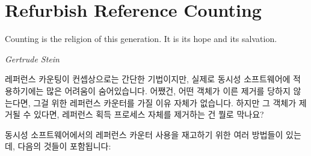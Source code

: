 
\section{Refurbish Reference Counting}
\label{sec:together:Refurbish Reference Counting}
%
\epigraph{Counting is the religion of this generation.  It is its
	  hope and its salvation.}
	 {\emph{Gertrude Stein}}

레퍼런스 카운팅이 컨셉상으로는 간단한 기법이지만, 실제로 동시성 소프트웨어에
적용하기에는 많은 어려움이 숨어있습니다.
어쨌건, 어떤 객체가 이른 제거를 당하지 않는다면, 그걸 위한 레퍼런스 카운터를
가질 이유 자체가 없습니다.
하지만 그 객체가 제거될 수 있다면, 레퍼런스 획득 프로세스 자체를 제거하는 건
뭘로 막나요?

동시성 소프트웨어에서의 레퍼런스 카운터 사용을 재고하기 위한 여러 방법들이 있는데, 다음의 것들이 포함됩니다:

\iffalse

Although reference counting is a conceptually simple technique,
many devils hide in the details when it is applied to concurrent
software.
After all, if the object was not subject to premature disposal,
there would be no need for the reference counter in the first place.
But if the object can be disposed of, what prevents disposal during
the reference-acquisition process itself?

There are a number of ways to refurbish reference counters for
use in concurrent software, including:

\fi

